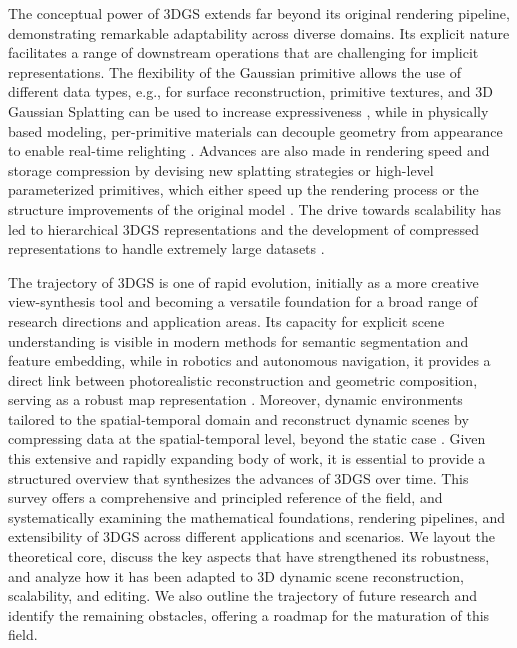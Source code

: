 \documentclass[11pt,a4paper]{article}
\begin{document}
The conceptual power of 3DGS extends far beyond its original rendering pipeline, demonstrating remarkable adaptability across diverse domains. Its explicit nature facilitates a range of downstream operations that are challenging for implicit representations. The flexibility of the Gaussian primitive allows the use of different data types, e.g., for surface reconstruction, primitive textures, and 3D Gaussian Splatting can be used to increase expressiveness \cite{arxiv:2403.17888v1,arxiv:2409.12954v1,arxiv:2412.12734v1}, while in physically based modeling, per-primitive materials can decouple geometry from appearance to enable real-time relighting \cite{arxiv:2506.13348v2,arxiv:2408.13370v1}. Advances are also made in rendering speed and storage compression by devising new splatting strategies or high-level parameterized primitives, which either speed up the rendering process or the structure improvements of the original model \cite{arxiv:2403.14244v1,arxiv:2606.03877v1,arxiv:2507.20200v1}. The drive towards scalability has led to hierarchical 3DGS representations and the development of compressed representations to handle extremely large datasets \cite{arxiv:2406.12080v1,arxiv:2502.19457v1}.

The trajectory of 3DGS is one of rapid evolution, initially as a more creative view-synthesis tool and becoming a versatile foundation for a broad range of research directions and application areas. Its capacity for explicit scene understanding is visible in modern methods for semantic segmentation and feature embedding, while in robotics and autonomous navigation, it provides a direct link between photorealistic reconstruction and geometric composition, serving as a robust map representation \cite{arxiv:2510.12174v2,arxiv:2409.11307v1,arxiv:2508.09977v5}. Moreover, dynamic environments tailored to the spatial-temporal domain and reconstruct dynamic scenes by compressing data at the spatial-temporal level, beyond the static case \cite{arxiv:2412.20720v2,arxiv:2401.03890v2}. Given this extensive and rapidly expanding body of work, it is essential to provide a structured overview that synthesizes the advances of 3DGS over time. This survey offers a comprehensive and principled reference of the field, and systematically examining the mathematical foundations, rendering pipelines, and extensibility of 3DGS across different applications and scenarios. We layout the theoretical core, discuss the key aspects that have strengthened its robustness, and analyze how it has been adapted to 3D dynamic scene reconstruction, scalability, and editing. We also outline the trajectory of future research and identify the remaining obstacles, offering a roadmap for the maturation of this field.
\end{document}

